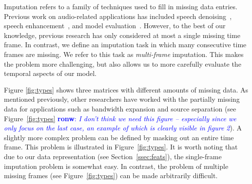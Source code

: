 \documentclass{article}
\newcommand{\FIXME}[2][FIXME]{\textcolor{blue}{\textbf{#1}: \emph{#2}}}
\begin{document}
Imputation refers to a family of techniques used to fill in missing
data entries.  Previous work on audio-related applications has
included speech denoising~\cite{Raj1998,Reyes-Gomez2005}, speech
enhancement~\cite{Sanneck1996}, and model
evaluation~\cite{Smaragdis2009,Hoffman2010}.  However, to the best of
our knowledge, previous research has only considered at most a single
missing time frame.
In contrast, we define an imputation task
in which  many consecutive time frames are missing.  We refer to
this task as \emph{multi-frame} imputation.  This makes the problem
more challenging, but also allows us to more carefully evaluate the
temporal aspects of our model.  %

Figure \ref{fig:types} shows three matrices with different amounts of
missing data.  As mentioned previously, other researchers
\cite{Smaragdis2009} have worked with the partially missing data for
applications such as bandwidth expansion and source separation (see
Figure~\ref{fig:types} \FIXME[ronw]{I don't think we need this figure
  -- especially since we only focus on the last case, an example of
  which is clearly
  visible in figure 2}).  A slightly more complex problem can be
defined by masking out an entire time frame.  This problem is
illustrated in Figure~\ref{fig:types}.  It is worth noting that due to
our data representation (see Section~\ref{ssec:feats}), the
single-frame imputation problem is somewhat easy.  In contrast, the
problem of multiple missing frames (see Figure~\ref{fig:types}) can be
made arbitrarily difficult.
\end{document}
